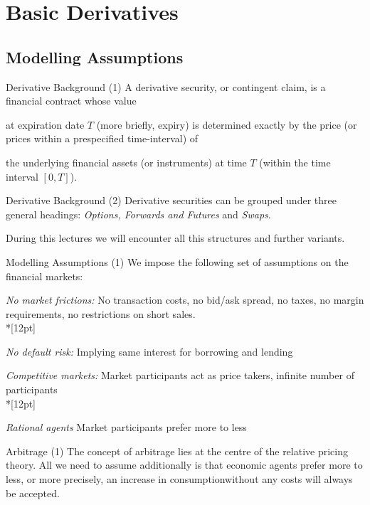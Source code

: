 
\section{Basic Derivatives}

\begin{center}
\end{center}


\subsection{Modelling Assumptions}

Derivative Background (1)
	A derivative security, or contingent claim, is a financial contract whose value
		
		at expiration date $T$ (more briefly, expiry) is determined exactly  by the price (or
		prices within a prespecified time-interval) of
	
		the underlying financial assets (or instruments) at time $T$ (within the time
		interval $[0,T]$).


Derivative Background (2)
	Derivative securities can be grouped under three general headings:
	{\it Options, Forwards and Futures} and {\it Swaps}.
	
	During this lectures we will encounter all this structures and further variants.


Modelling Assumptions (1)
	We impose the following set of assumptions on the financial markets:
	
		{\it No market frictions: } No transaction costs, no bid/ask spread, no taxes,
		no margin requirements, no restrictions on short sales.\\*[12pt]
 
		{\it No default risk:} Implying same interest for borrowing and lending

		{\it Competitive markets:}  Market participants act as price takers, infinite number of participants\\*[12pt]
 
		{\it Rational agents} Market participants prefer more to less


Arbitrage (1)
	The concept of arbitrage lies at the centre of the relative pricing theory. All we need to assume
	additionally is that economic agents prefer more to less, or more precisely, an increase in 
	consumptionwithout any costs will always be accepted.


